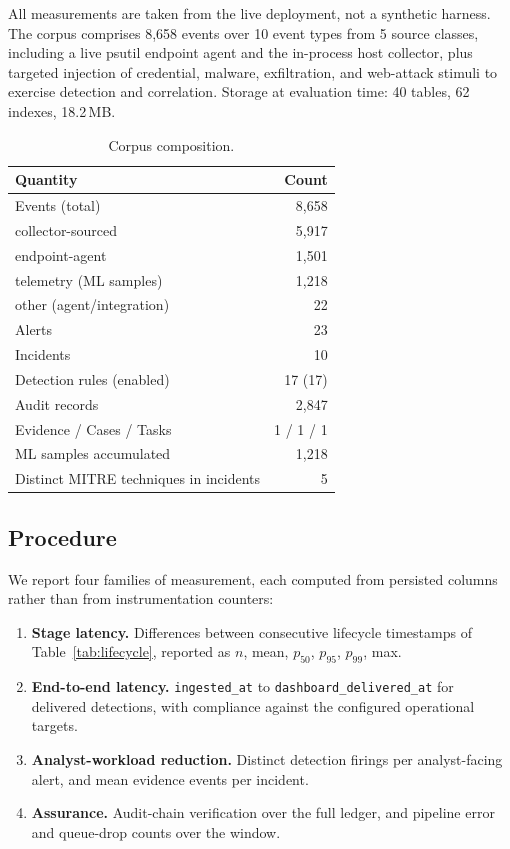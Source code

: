 \documentclass[conference]{IEEEtran}
\begin{document}
All measurements are taken from the live deployment, not a synthetic
harness. The corpus comprises 8{,}658 events over 10 event types from 5
source classes, including a live psutil endpoint agent and the in-process
host collector, plus targeted injection of credential, malware,
exfiltration, and web-attack stimuli to exercise detection and correlation.
Storage at evaluation time: 40 tables, 62 indexes, 18.2\,MB.

\begin{table}[t]
\caption{Corpus composition.}
\label{tab:corpus}
\centering
\small
\begin{tabular}{@{}lr@{}}
\toprule
\textbf{Quantity} & \textbf{Count} \\
\midrule
Events (total) & 8{,}658 \\
\quad collector-sourced & 5{,}917 \\
\quad endpoint-agent & 1{,}501 \\
\quad telemetry (ML samples) & 1{,}218 \\
\quad other (agent/integration) & 22 \\
Alerts & 23 \\
Incidents & 10 \\
Detection rules (enabled) & 17 (17) \\
Audit records & 2{,}847 \\
Evidence / Cases / Tasks & 1 / 1 / 1 \\
ML samples accumulated & 1{,}218 \\
Distinct MITRE techniques in incidents & 5 \\
\bottomrule
\end{tabular}
\end{table}

\subsection{Procedure}

We report four families of measurement, each computed from persisted columns
rather than from instrumentation counters:

\begin{enumerate}
\item \textbf{Stage latency.} Differences between consecutive lifecycle
      timestamps of Table~\ref{tab:lifecycle}, reported as
      $n$, mean, $p_{50}$, $p_{95}$, $p_{99}$, max.
\item \textbf{End-to-end latency.} \texttt{ingested\_at} to
      \texttt{dashboard\_delivered\_at} for delivered detections, with
      compliance against the configured operational targets.
\item \textbf{Analyst-workload reduction.} Distinct detection firings per
      analyst-facing alert, and mean evidence events per incident.
\item \textbf{Assurance.} Audit-chain verification over the full ledger, and
      pipeline error and queue-drop counts over the window.
\end{enumerate}
\end{document}
